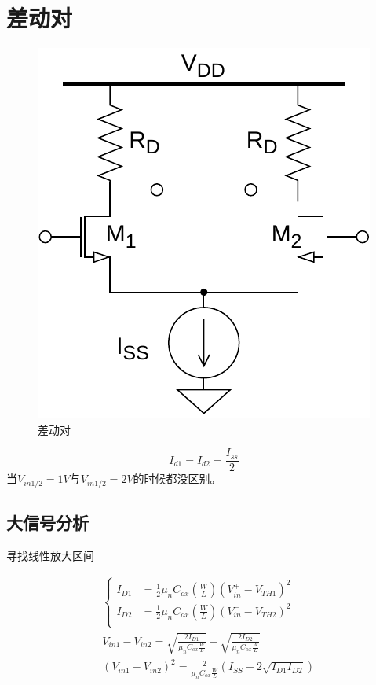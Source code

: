 \documentclass[twoside,a4paper,openright,titlepage,draft]{ctexrep}
\begin{document}
\section{差动对}
\begin{multicols}{2}
    \begin{figure}[H]
        \centering
        \includegraphics[width=0.8\columnwidth]{differentialpair.drawio.pdf}
        \caption{差动对}
        \label{fig:差动对}
    \end{figure}
    \columnbreak
    \begin{equation}
        I_{d1} = I_{d2} = \frac{I_{ss}}{2}
    \end{equation}
    当$V_{in1/2} = 1V$与$V_{in1/2} = 2V$的时候都没区别。
    \subsection{大信号分析}
    寻找线性放大区间
\end{multicols}
\begin{align}
    &\begin{cases}
        I_{D1} &= \frac{1}{2}\mu_nC_{ox}(\frac{W}{L})(V_{in}^+ - V_{TH1})^2 \\
        I_{D2} &= \frac{1}{2}\mu_nC_{ox}(\frac{W}{L})(V_{in}^- - V_{TH2})^2 \\
    \end{cases}\\
    &V_{in1} - V_{in2} = \sqrt{\frac{2I_{D1}}{\mu_nC_{ox}\frac{W}{L}}} - \sqrt{\frac{2I_{D2}}{\mu_nC_{ox}\frac{W}{L}}}\\
    &(V_{in1} - V_{in2})^2 = \frac{2}{\mu_nC_{ox}\frac{W}{L}}(I_{SS} - 2\sqrt{I_{D1}I_{D2}})
\end{align}
\end{document}
